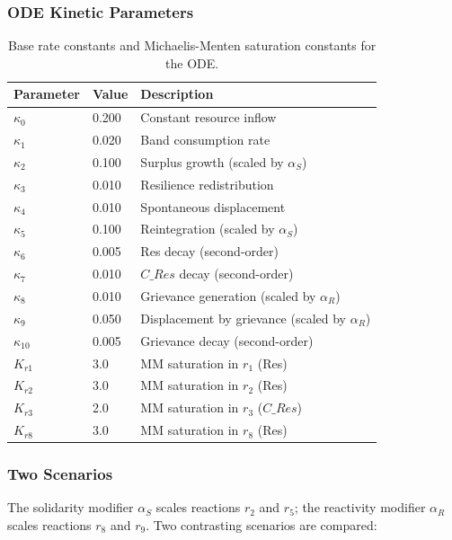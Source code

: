\subsubsection*{ODE Kinetic Parameters}

\begin{table}[h]
\centering
\caption{Base rate constants and Michaelis-Menten saturation constants for the ODE.}
\label{tab:s3_ode_params}
\begin{tabular}{lll}
\toprule
Parameter         & Value   & Description \\
\midrule
$\kappa_0$        & 0.200   & Constant resource inflow \\
$\kappa_1$        & 0.020   & Band consumption rate \\
$\kappa_2$        & 0.100   & Surplus growth (scaled by $\alpha_S$) \\
$\kappa_3$        & 0.010   & Resilience redistribution \\
$\kappa_4$        & 0.010   & Spontaneous displacement \\
$\kappa_5$        & 0.100   & Reintegration (scaled by $\alpha_S$) \\
$\kappa_6$        & 0.005   & Res decay (second-order) \\
$\kappa_7$        & 0.010   & $C\_\textit{Res}$ decay (second-order) \\
$\kappa_8$        & 0.010   & Grievance generation (scaled by $\alpha_R$) \\
$\kappa_9$        & 0.050   & Displacement by grievance (scaled by $\alpha_R$) \\
$\kappa_{10}$     & 0.005   & Grievance decay (second-order) \\
\midrule
$K_{r1}$          & 3.0     & MM saturation in $r_1$ (Res) \\
$K_{r2}$          & 3.0     & MM saturation in $r_2$ (Res) \\
$K_{r3}$          & 2.0     & MM saturation in $r_3$ ($C\_\textit{Res}$) \\
$K_{r8}$          & 3.0     & MM saturation in $r_8$ (Res) \\
\bottomrule
\end{tabular}
\end{table}

\subsubsection*{Two Scenarios}

The solidarity modifier $\alpha_S$ scales reactions $r_2$ and $r_5$;
the reactivity modifier $\alpha_R$ scales reactions $r_8$ and $r_9$.
Two contrasting scenarios are compared:

